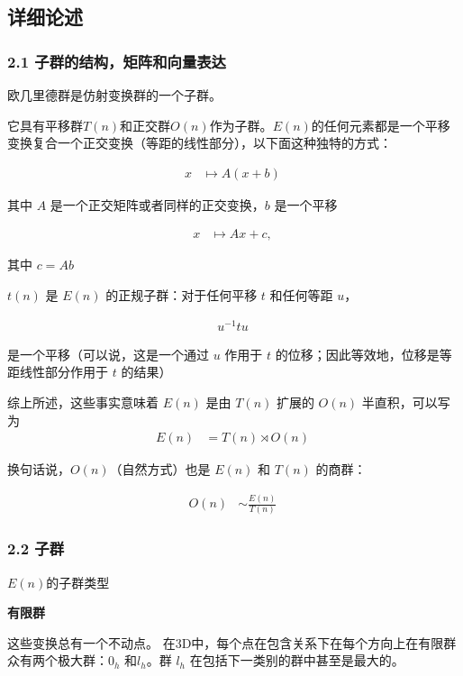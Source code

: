 \subsection{详细论述}



\subsubsection{2.1 子群的结构，矩阵和向量表达}

欧几里德群是仿射变换群的一个子群。

它具有平移群$T(n)$和正交群$O(n)$作为子群。$E(n)$的任何元素都是一个平移变换复合一个正交变换（等距的线性部分），以下面这种独特的方式：

\begin{align}
x & \mapsto A(x + b)~
\end{align}

其中 $A$ 是一个正交矩阵或者同样的正交变换，$b$ 是一个平移

\begin{align}
x & \mapsto Ax + c,~
\end{align}

其中 $c = Ab$

$t(n)$ 是 $E(n)$ 的正规子群：对于任何平移 $t$ 和任何等距 $u$，

\begin{align}
u^{-1} tu~
\end{align}

是一个平移（可以说，这是一个通过 $u$ 作用于 $t$ 的位移；因此等效地，位移是等距线性部分作用于 $t$ 的结果）

综上所述，这些事实意味着 $E(n)$ 是由 $T(n)$ 扩展的 $O(n)$ 半直积，可以写为
\begin{align}
E(n) &= T(n) \rtimes O(n)~
\end{align}

换句话说，$O(n)$（自然方式）也是 $E(n)$ 和 $T(n)$ 的商群：

\begin{align}
O(n) &\sim \frac{E(n)}{T(n)}~
\end{align}



\subsubsection{2.2 子群}

$E(n)$的子群类型

\textbf{有限群}

这些变换总有一个不动点。 在3D中，每个点在包含关系下在每个方向上在有限群众有两个极大群：$0_h$ 和$l_h$。群 $l_h$ 在包括下一类别的群中甚至是最大的。

